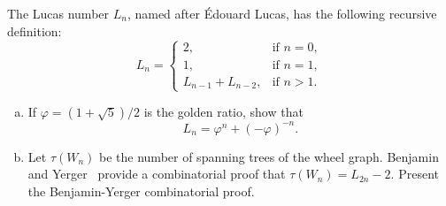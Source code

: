 \begin{problem}
\item The Lucas number $L_n$, named after
  \'Edouard Lucas, has the following recursive
  definition:
  \[
  L_n
  =
  \begin{cases}
  2, & \text{if } n = 0, \\[4pt]
  1, & \text{if } n = 1, \\[4pt]
  L_{n-1} + L_{n-2}, & \text{if } n > 1.
  \end{cases}
  \]
  \begin{enumerate}[(a)]
  \item If $\varphi = (1 + \sqrt{5}) / 2$ is the
    golden ratio, show that
    \[
    L_n
    =
    \varphi^n + (-\varphi)^{-n}.
    \]

  \item Let $\tau(W_n)$ be the number of
    spanning trees of the
    wheel graph.
    Benjamin and
    Yerger~\cite{BenjaminYerger2006} provide a
    combinatorial proof that $\tau(W_n) = L_{2n} - 2$. Present the
    Benjamin-Yerger combinatorial proof.
  \end{enumerate}
\end{problem}
